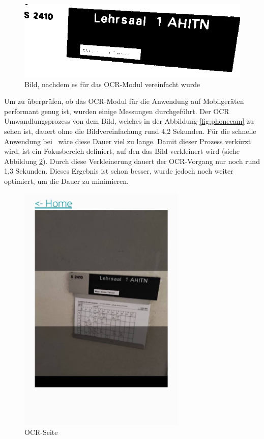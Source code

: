 \begin{figure}
    \centering
    \includegraphics[width=120mm]{media/OCR/compressed}
    \caption{Bild, nachdem es für das OCR-Modul vereinfacht wurde}
    \label{ocroptimised}
\end{figure}


\pagebreak

\label{sec:ocrmessung}

Um zu überprüfen, ob das OCR-Modul für die Anwendung auf Mobilgeräten performant genug ist, wurden einige Messungen durchgeführt. Der OCR Umwandlungsprozess von dem Bild, welches in der Abbildung \ref{fig:phonecam} zu sehen ist, dauert ohne die Bildvereinfachung rund 4,2 Sekunden. Für die schnelle Anwendung bei \ZELIA\ wäre diese Dauer viel zu lange. Damit dieser Prozess verkürzt wird, ist ein Fokusbereich definiert, auf den das Bild verkleinert wird (siehe Abbildung \ref{fig:ocrfocus}). Durch diese Verkleinerung dauert der OCR-Vorgang nur noch rund 1,3 Sekunden. Dieses Ergebnis ist schon besser, wurde jedoch noch weiter optimiert, um die Dauer zu minimieren. 

\begin{figure}[H]
    \centering
    \includegraphics[width=80mm]{media/WebComponents/OCRSeite_light.jpg}
    \caption{OCR-Seite}
    \label{fig:ocrfocus}
\end{figure}

